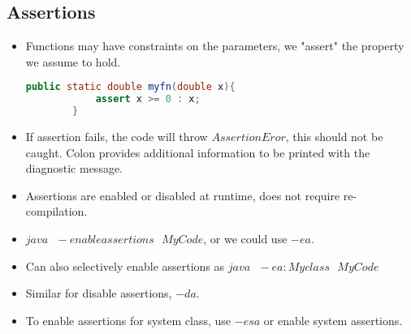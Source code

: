 \documentclass[a4paper]{article}
\begin{document}
\subsection{Assertions}
\begin{itemize}
    \item Functions may have constraints on the parameters, we "assert" the property we assume to hold.
    \begin{lstlisting}[language=Java]
        public static double myfn(double x){
            assert x >= 0 : x;
        }
    \end{lstlisting}
    \item If assertion fails, the code will throw $AssertionEror$, this should not be caught. Colon provides additional information to be printed with the diagnostic message.
    \item Assertions are enabled or disabled at runtime, does not require re-compilation.
    \item $java\text{ }-enableassertions\text{ }MyCode$, or we could use $-ea$.
    \item Can also selectively enable assertions as $java\text{ }-ea:Myclass\text{ }MyCode$
    \item Similar for disable assertions, $-da$.
    \item To enable assertions for system class, use $-esa$ or enable system assertions.
\end{itemize}
\end{document}
